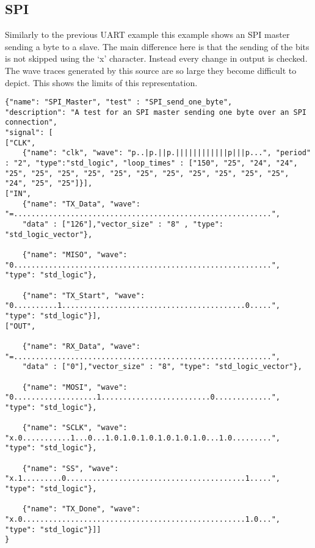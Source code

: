 \subsection{SPI}
Similarly to the previous UART example this example shows an SPI master sending a byte to a slave. The main difference here is that the sending of the bits is not skipped using the ‘x’ character. Instead every change in output is checked. The wave traces generated by this source are so large they become difficult to depict. This shows the limits of this representation.
\begin{lstlisting}[style=json, caption={Functionality test for the SPI design in appendix \ref{appendix:spi}}, label={json:spi}]
{"name": "SPI_Master", "test" : "SPI_send_one_byte",
"description": "A test for an SPI master sending one byte over an SPI connection",
"signal": [
["CLK",
	{"name": "clk", "wave": "p..|p.||p.||||||||||||p|||p...", "period" : "2", "type":"std_logic", "loop_times" : ["150", "25", "24", "24", "25", "25", "25", "25", "25", "25", "25", "25", "25", "25", "25", "24", "25", "25"]}],
["IN",
	{"name": "TX_Data", "wave": "=...........................................................",
	"data" : ["126"],"vector_size" : "8" , "type": "std_logic_vector"},
	
	{"name": "MISO", "wave": "0...........................................................", "type": "std_logic"},
	
	{"name": "TX_Start", "wave": "0..........1..........................................0.....", "type": "std_logic"}],
["OUT",

	{"name": "RX_Data", "wave": "=...........................................................",
	"data" : ["0"],"vector_size" : "8", "type": "std_logic_vector"},
	
	{"name": "MOSI", "wave": "0...................1.........................0.............", "type": "std_logic"},
	
	{"name": "SCLK", "wave": "x.0...........1...0...1.0.1.0.1.0.1.0.1.0.1.0...1.0.........", "type": "std_logic"},
	
	{"name": "SS", "wave": "x.1.........0.........................................1.....", "type": "std_logic"},
	
	{"name": "TX_Done", "wave": "x.0...................................................1.0...", "type": "std_logic"}]]
}
\end{lstlisting}
\clearpage
